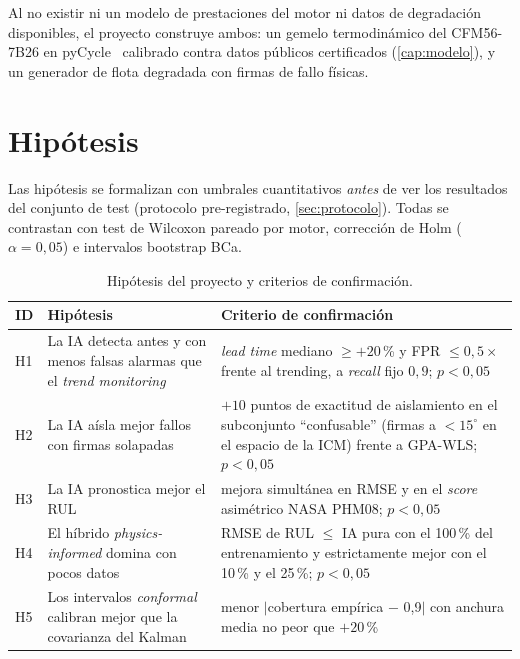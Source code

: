 Al no existir ni un modelo de prestaciones del motor ni datos de degradación disponibles, el
proyecto construye ambos: un gemelo termodinámico del CFM56-7B26 en
pyCycle~\cite{Hendricks2019} calibrado contra datos públicos certificados
(\cref{cap:modelo}), y un generador de flota degradada con firmas de fallo físicas.

\section{Hipótesis}
\label{sec:hipotesis}

Las hipótesis se formalizan con umbrales cuantitativos \emph{antes} de ver los resultados del
conjunto de test (protocolo pre-registrado, \cref{sec:protocolo}). Todas se contrastan con test
de Wilcoxon pareado por motor, corrección de Holm ($\alpha = 0{,}05$) e intervalos bootstrap BCa.

\begin{table}[htbp]
  \centering\small
  \caption{Hipótesis del proyecto y criterios de confirmación.}
  \label{tab:hipotesis}
  \begin{tabular}{p{0.6cm}p{5.4cm}p{7.6cm}}
    \toprule
    ID & Hipótesis & Criterio de confirmación \\
    \midrule
    H1 & La IA detecta antes y con menos falsas alarmas que el \emph{trend monitoring} &
      \emph{lead time} mediano $\geq +20$\,\% y FPR $\leq 0{,}5\times$ frente al trending, a
      \emph{recall} fijo $0{,}9$; $p<0{,}05$ \\
    H2 & La IA aísla mejor fallos con firmas solapadas &
      $+10$ puntos de exactitud de aislamiento en el subconjunto ``confusable'' (firmas a
      $<15^{\circ}$ en el espacio de la ICM) frente a GPA-WLS; $p<0{,}05$ \\
    H3 & La IA pronostica mejor el RUL &
      mejora simultánea en RMSE y en el \emph{score} asimétrico NASA PHM08; $p<0{,}05$ \\
    H4 & El híbrido \emph{physics-informed} domina con pocos datos &
      RMSE de RUL $\leq$ IA pura con el 100\,\% del entrenamiento y estrictamente mejor con el
      10\,\% y el 25\,\%; $p<0{,}05$ \\
    H5 & Los intervalos \emph{conformal} calibran mejor que la covarianza del Kalman &
      menor $|$cobertura empírica $-$ 0{,}9$|$ con anchura media no peor que $+20$\,\% \\
    \bottomrule
  \end{tabular}
\end{table}

